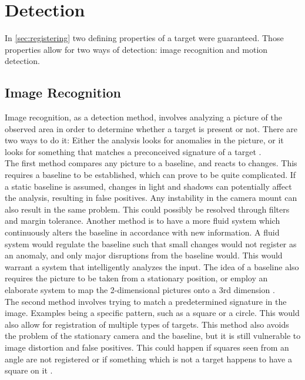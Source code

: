 \section{Detection}\label{sec:prelimdetection}
In \cref{sec:registering} two defining properties of a target were guaranteed. Those properties allow for two ways of detection: image recognition and motion detection.

\subsection{Image Recognition}
Image recognition, as a detection method, involves analyzing a picture of the observed area in order to determine whether a target is present or not. There are two ways to do it: Either the analysis looks for anomalies in the picture, or it looks for something that matches a preconceived signature of a target \cite{PatternRecognition} \cite{Brown:2003:RP:946247.946772}.\\

The first method compares any picture to a baseline, and reacts to changes. This requires a baseline to be established, which can prove to be quite complicated. If a static baseline is assumed, changes in light and shadows can potentially affect the analysis, resulting in false positives. Any instability in the camera mount can also result in the same problem. This could possibly be resolved through filters and margin tolerance. Another method is to have a more fluid system which continuously alters the baseline in accordance with new information. A fluid system would regulate the baseline such that small changes would not register as an anomaly, and only major disruptions from the baseline would. This would warrant a system that intelligently analyzes the input. The idea of a baseline also requires the picture to be taken from a stationary position, or employ an elaborate system to map the 2-dimensional pictures onto a 3rd dimension \cite{Brown:2003:RP:946247.946772}. \\

The second method involves trying to match a predetermined signature in the image. Examples being a specific pattern, such as a square or a circle. This would also allow for registration of multiple types of targets. This method also avoids the problem of the stationary camera and the baseline, but it is still vulnerable to image distortion and false positives. This could happen if squares seen from an angle are not registered or if something which is not a target happens to have a square on it \cite{PatternRecognition}.

